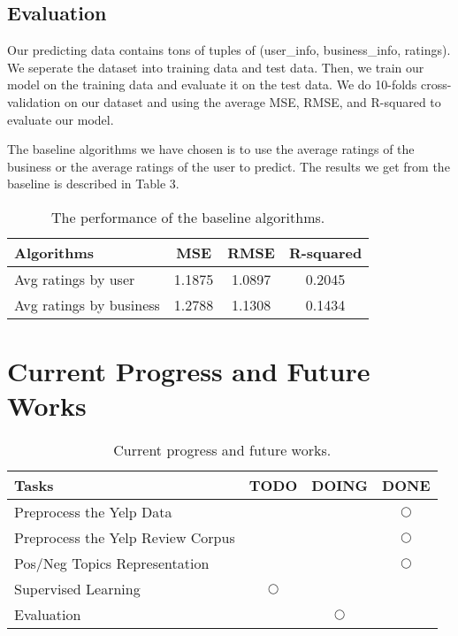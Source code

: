 \documentclass[10pt,twocolumn,letterpaper]{article}
\begin{document}
\subsection{Evaluation}
Our predicting data contains tons of tuples of (user\_info, business\_info, ratings). We seperate the dataset into training data and test data. Then, we train our model on the training data and evaluate it on the test data. We do 10-folds cross-validation on our dataset and using the average MSE, RMSE, and R-squared to evaluate our model.

The baseline algorithms we have chosen is to use the average ratings of the business or the average ratings of the user to predict. The results we get from the baseline is described in Table 3.

\begin{table}[h!]
\label{table:baseline}
\begin{center}
\begin{tabular}{|l|c|c|c|}
\hline
Algorithms & MSE & RMSE & R-squared\\
\hline\hline
Avg ratings by user & 1.1875 & 1.0897 & 0.2045 \\
Avg ratings by business & 1.2788 & 1.1308 & 0.1434\\
\hline
\end{tabular}
\end{center}
\caption{The performance of the baseline algorithms.}
\end{table}

\section{Current Progress and Future Works}

\begin{table}[h!]
\label{table:progress}
\begin{center}
\begin{tabular}{|l|c|c|c|}
\hline
Tasks & TODO & DOING & DONE \\
\hline\hline
Preprocess the Yelp Data & & & $\bigcirc$ \\
Preprocess the Yelp Review Corpus & & & $\bigcirc$ \\
Pos/Neg Topics Representation & & & $\bigcirc$ \\
Supervised Learning & $\bigcirc$ & & \\
Evaluation & & $\bigcirc$ & \\
\hline
\end{tabular}
\end{center}
\caption{Current progress and future works.}
\end{table}

{\small


}
\end{document}

